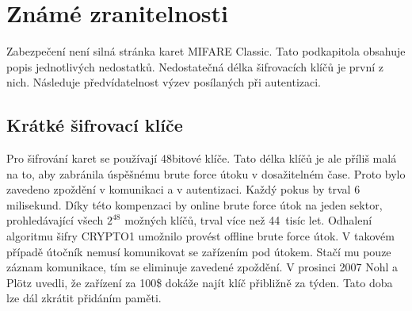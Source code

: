 \chapter{Známé zranitelnosti}
Zabezpečení není silná stránka karet MIFARE Classic. Tato podkapitola obsahuje popis jednotlivých nedostatků. Nedostatečná délka šifrovacích klíčů je první z nich. Následuje předvídatelnost výzev posílaných při autentizaci.
\par
\section{Krátké šifrovací klíče}
Pro šifrování karet se používají 48bitové klíče. Tato délka klíčů je ale příliš malá na to, aby zabránila úspěšnému brute force útoku v dosažitelném čase. Proto bylo zavedeno zpoždění v komunikaci a v autentizaci. Každý pokus by trval 6 milisekund. Díky této kompenzaci by online brute force útok na jeden sektor, prohledávající všech $2^{48}$ možných klíčů, trval více než 44~tisíc let. Odhalení algoritmu šifry CRYPTO1 umožnilo provést offline brute force útok. V takovém případě útočník nemusí komunikovat se zařízením pod útokem. Stačí mu pouze záznam komunikace, tím se eliminuje zavedené zpoždění. V prosinci 2007 Nohl a Plötz uvedli, že zařízení za 100\$ dokáže najít klíč přibližně za týden. Tato doba lze dál zkrátit přidáním paměti\cite{Cryptanalisis}.
\par
